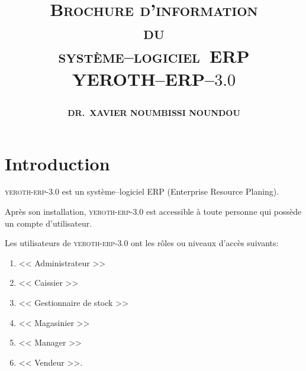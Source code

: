 \documentclass[a4paper, 10pt, twocolumn]{article}
\newcommand{\pos}{syst\`eme--logiciel~ERP\xspace}
\newcommand{\yerenpos}{\textcolor{yerenColorBlue}{\sc YEROTH--ERP--$3.0$}\xspace}
\newcommand{\myfullacademicname}{DR.~XAVIER NOUMBISSI NOUNDOU\xspace}
\newcommand{\yeren}{\textsc{yeroth-erp-3.0}\xspace}
\newcommand{\manager}{<< Manager >>\xspace}
\newcommand{\caissier}{<< Caissier >>\xspace}
\newcommand{\administrateur}{<< Administrateur >>\xspace}
\newcommand{\magasinier}{<< Magasinier >>\xspace}
\newcommand{\vendeur}{<< Vendeur >>\xspace}
\newcommand{\gestionairedestocks}{<< Gestionnaire de stock >>\xspace}
\begin{document}

\title{
\vspace{-1.65em}
\textcolor{medgreen}{\textsc{\textbf{Brochure d'information \\
										du \\
									 \pos \\ \vspace{1em}
									 \yerenpos}}}
									 \author{\textbf{\myfullacademicname}}
}

\date{} 
\maketitle
\thispagestyle{fancy}



\vspace{-1.3em}
\section{Introduction}
\vspace{-0.3em}
\yeren est un syst\`eme--logiciel ERP (Enterprise Resource Planing).

Apr\`es son installation, \yeren est accessible \`a
toute personne qui poss\`ede un compte d'utilisateur.

Les utilisateurs de \yeren ont les r\^oles ou 
niveaux d'acc\`es suivants:
\begin{enumerate}[1)]
	\itemsep -0.6em
	\item \administrateur
	\item \caissier	
	\item \gestionairedestocks
	\item \magasinier	
	\item \manager
	\item \vendeur.
\end{enumerate}
\end{document}
